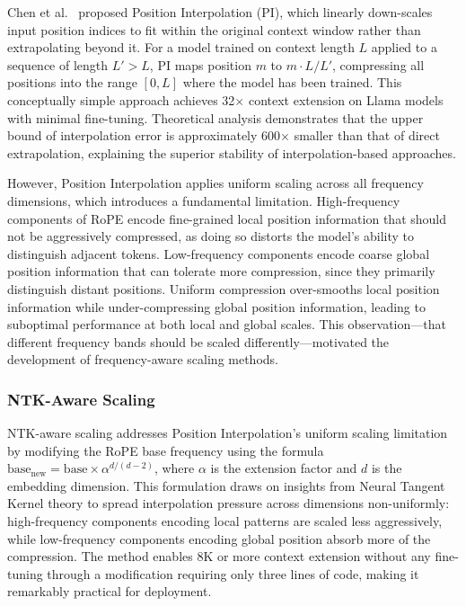 \documentclass[11pt,letterpaper]{article}
\begin{document}
Chen et al.\ \cite{chen2023extending} proposed Position Interpolation (PI), which linearly down-scales input position indices to fit within the original context window rather than extrapolating beyond it. For a model trained on context length $L$ applied to a sequence of length $L' > L$, PI maps position $m$ to $m \cdot L / L'$, compressing all positions into the range $[0, L]$ where the model has been trained. This conceptually simple approach achieves 32$\times$ context extension on Llama models with minimal fine-tuning. Theoretical analysis demonstrates that the upper bound of interpolation error is approximately 600$\times$ smaller than that of direct extrapolation, explaining the superior stability of interpolation-based approaches.

However, Position Interpolation applies uniform scaling across all frequency dimensions, which introduces a fundamental limitation. High-frequency components of RoPE encode fine-grained local position information that should not be aggressively compressed, as doing so distorts the model's ability to distinguish adjacent tokens. Low-frequency components encode coarse global position information that can tolerate more compression, since they primarily distinguish distant positions. Uniform compression over-smooths local position information while under-compressing global position information, leading to suboptimal performance at both local and global scales. This observation---that different frequency bands should be scaled differently---motivated the development of frequency-aware scaling methods.

\subsubsection{NTK-Aware Scaling}

NTK-aware scaling addresses Position Interpolation's uniform scaling limitation by modifying the RoPE base frequency using the formula $\text{base}_\text{new} = \text{base} \times \alpha^{d/(d-2)}$, where $\alpha$ is the extension factor and $d$ is the embedding dimension. This formulation draws on insights from Neural Tangent Kernel theory to spread interpolation pressure across dimensions non-uniformly: high-frequency components encoding local patterns are scaled less aggressively, while low-frequency components encoding global position absorb more of the compression. The method enables 8K or more context extension without any fine-tuning through a modification requiring only three lines of code, making it remarkably practical for deployment.
\end{document}
